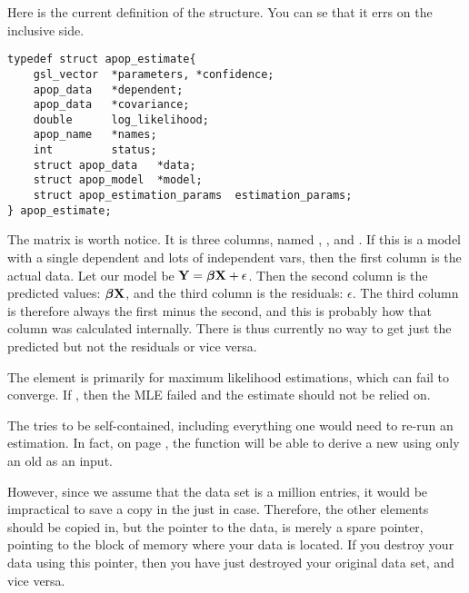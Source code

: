 Here is the current definition of the  structure. You can se that it errs on the inclusive side.
\begin{lstlisting}
typedef struct apop_estimate{
    gsl_vector  *parameters, *confidence;
    apop_data   *dependent;
    apop_data   *covariance;
    double      log_likelihood;
    apop_name   *names;
    int         status;
    struct apop_data   *data;
    struct apop_model  *model;
    struct apop_estimation_params  estimation_params;
} apop_estimate;
\end{lstlisting}

The  matrix is worth notice. It is three columns, named 
, , and . 
 If this is a model with a single dependent and lots of
independent vars, then the first column is the actual data. Let our
model be ${\bf Y} = {\mbox{\boldmath$\beta$}} {\bf X} + \epsilon$. Then the second column is the
predicted values: ${\mbox{\boldmath$\beta$}} {\bf X}$, and the third column is the residuals:
$\epsilon$. The third column is therefore always the first minus
the second, and this is probably how that column was calculated
internally. There is thus currently no way to get just the predicted
but not the residuals or vice versa.

The  element is primarily for maximum likelihood
estimations, which can fail to converge. If ,
then the MLE failed and the estimate should not be relied on.

The  tries to be self-contained, including
everything one would need to re-run an estimation. In fact, on page
\pageref{restart}, the  function will be
able to derive a new  using only an old
 as an input. 

However, since we assume that the data set is a million entries, it
would be impractical to save a copy in the 
just in case. Therefore, the other elements should be copied in, but
the pointer to the data,  is merely a spare
pointer, pointing to the block of memory where your data is located. If
you destroy your data using this pointer, then you have just destroyed
your original data set, and vice versa.


